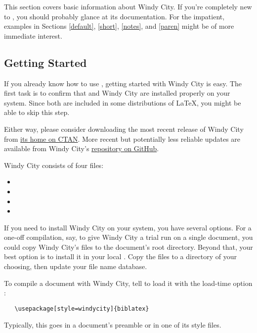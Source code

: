 \documentclass[11pt,letterpaper,oneside]{article}
\begin{document}
This section covers basic information about Windy City. If you're
completely new to \biblatex, you should probably glance at its
documentation. For the impatient, examples in Sections \ref{default},
\ref{short}, \ref{notes}, and \ref{paren} might be of more immediate
interest.

\subsection{Getting Started}

If you already know how to use \biblatex, getting started with Windy
City is easy. The first task is to confirm that \biblatex and Windy
City are installed properly on your system. Since both are included in
some distributions of \LaTeX, you might be able to skip this step.

Either way, please consider downloading the most recent release of
Windy City from \begingroup \hypersetup{urlcolor=blue}
\href{https://www.ctan.org/pkg/windycity}{its home on CTAN}. More
recent but potentially less reliable updates are available from Windy
City's \href{https://github.com/brianchase/windycity}{repository on
GitHub}.\endgroup

Windy City consists of four files:

\begin{itemize}[before=\small]
\item {}
\item {}
\item {}
\item {}
\end{itemize}

If you need to install Windy City on your system, you have several
options. For a one-off compilation, say, to give Windy City a trial
run on a single document, you could copy Windy City's files to the
document's root directory. Beyond that, your best option is to install
it in your local . Copy the files to a directory of your
choosing, then update your  file name database.

To compile a document with Windy City, tell \biblatex to load it with
the load-time option :

\begin{verbatim}
   \usepackage[style=windycity]{biblatex}
\end{verbatim}

\noindent Typically, this goes in a document's preamble or in one of
its style files.
\end{document}
